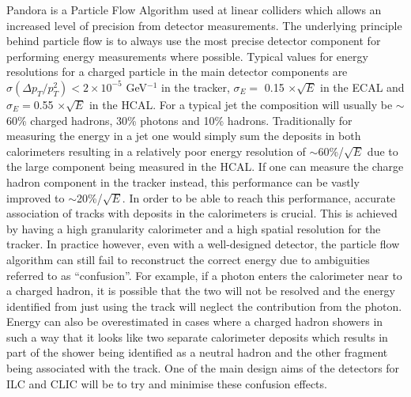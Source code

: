 Pandora\cite{Thomson200925} is a Particle Flow Algorithm used at linear colliders which allows an increased level of precision from detector measurements. The underlying principle behind particle flow is to always use the most precise detector component for performing energy measurements where possible. Typical values for energy resolutions for a charged particle in the main detector components are $\sigma(\Delta p_T/ p_{T}^2) < 2 \times 10^{-5}$ GeV$^{-1}$ in the tracker, $\sigma_E =$ 0.15 $\times \sqrt{E}$ in the \ac{ECAL} and $\sigma_E =$0.55 $\times \sqrt{E}$ in the \ac{HCAL}. For a typical jet the composition will usually be $\sim$60\% charged hadrons, 30\% photons and 10\% hadrons. Traditionally for measuring the energy in a jet one would simply sum the deposits in both calorimeters resulting in a relatively poor energy resolution of $\sim$60\%/$\sqrt{E}$ due to the large component being measured in the \ac{HCAL}. If one can measure the charge hadron component in the tracker instead, this performance can be vastly improved to $\sim$20\%/$\sqrt{E}$. In order to be able to reach this performance, accurate association of tracks with deposits in the calorimeters is crucial. This is achieved by having a high granularity calorimeter and a high spatial resolution for the tracker. In practice however, even with a well-designed detector, the particle flow algorithm can still fail to reconstruct the correct energy due to ambiguities referred to as ``confusion''. For example, if a photon enters the calorimeter near to a charged hadron, it is possible that the two will not be resolved and the energy identified from just using the track will neglect the contribution from the photon. Energy can also be overestimated in cases where a charged hadron showers in such a way that it looks like two separate calorimeter deposits which results in part of the shower being identified as a neutral hadron and the other fragment being associated with the track. One of the main design aims of the detectors for \ac{ILC} and \ac{CLIC} will be to try and minimise these confusion effects. 



